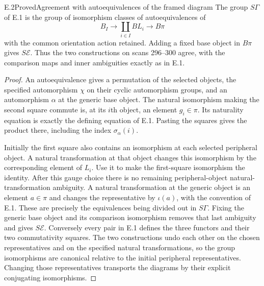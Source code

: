 \begin{claim}{E.2}{Proved}{Agreement with autoequivalences of the framed diagram}
The group $S\Gamma$ of E.1 is the group of isomorphism classes of
autoequivalences of
\[
 B_I\longrightarrow\coprod_{i\in I}BL_i\longrightarrow B\pi
\]
with the common orientation action retained. Adding a fixed base object
in $B\pi$ gives $S\mathcal E$. Thus the two constructions on scans
296--300 agree, with the comparison maps and inner ambiguities exactly
as in E.1.
\end{claim}
\begin{proof}
An autoequivalence gives a permutation of the selected objects, the
specified automorphism $\chi$ on their cyclic automorphism groups,
and an automorphism $\alpha$ at the generic base object. The natural
isomorphism making the second square commute is, at its $i$th object,
an element $g_i\in\pi$. Its naturality equation is exactly the defining
equation of E.1. Pasting the squares gives the product there, including
the index $\sigma_\alpha(i)$.

Initially the first square also contains an isomorphism at each selected
peripheral object. A natural transformation at that object changes this
isomorphism by the corresponding element of $L_i$. Use it to make the
first-square isomorphism the identity. After this gauge choice there
is no remaining peripheral-object natural-transformation ambiguity.
A natural transformation at the generic object is an element $a\in\pi$
and changes the representative by $\iota(a)$, with the convention of
E.1. These are precisely the equivalences being divided out in
$S\Gamma$. Fixing the generic base object and its comparison
isomorphism removes that last ambiguity and gives $S\mathcal E$.
Conversely every pair in E.1 defines the three functors and their two
commutativity squares. The two constructions undo each other on the
chosen representatives and on the specified natural transformations,
so the group isomorphisms are canonical relative to the initial
peripheral representatives. Changing those representatives transports
the diagrams by their explicit conjugating isomorphisms.
\end{proof}

